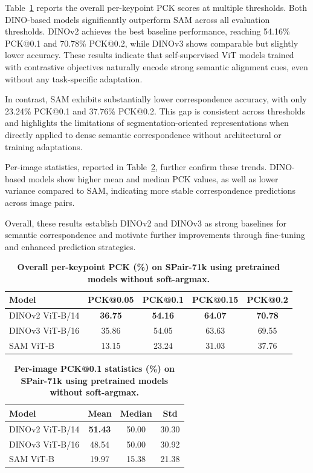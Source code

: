 Table~\ref{tab:baseline_keypoint} reports the overall per-keypoint PCK scores at multiple thresholds.
Both DINO-based models significantly outperform SAM across all evaluation thresholds. DINOv2 achieves the best baseline performance, reaching 54.16\% PCK@0.1
and 70.78\% PCK@0.2, while DINOv3 shows comparable but slightly lower accuracy. These results indicate that self-supervised ViT models trained with
contrastive objectives naturally encode strong semantic alignment cues, even without any task-specific adaptation.

In contrast, SAM exhibits substantially lower correspondence accuracy, with only 23.24\% PCK@0.1 and 37.76\% PCK@0.2. This gap is consistent across
thresholds and highlights the limitations of segmentation-oriented representations when directly applied to dense semantic correspondence without
architectural or training adaptations.

Per-image statistics, reported in Table~\ref{tab:baseline_image}, further confirm these trends.
DINO-based models show higher mean and median PCK values, as well as lower variance compared to SAM, indicating more stable correspondence
predictions across image pairs.

Overall, these results establish DINOv2 and DINOv3 as strong baselines for semantic correspondence and motivate further improvements through fine-tuning and enhanced prediction strategies.


\begin{table}[t]
    \centering
    \caption{\textbf{Overall per-keypoint PCK (\%) on SPair-71k using pretrained models without soft-argmax.}}
    \label{tab:baseline_keypoint}
    \setlength{\tabcolsep}{2pt}
    \begin{tabular}{lcccc}
    \toprule
    Model & PCK@0.05 & PCK@0.1 & PCK@0.15 & PCK@0.2 \\
    \midrule
    DINOv2 ViT-B/14 & \textbf{36.75} & \textbf{54.16} & \textbf{64.07} & \textbf{70.78} \\
    DINOv3 ViT-B/16 & 35.86 & 54.05 & 63.63 & 69.55 \\
    SAM ViT-B       & 13.15 & 23.24 & 31.03 & 37.76 \\
    \bottomrule
    \end{tabular}
\end{table}


\begin{table}[t]
    \centering
    \caption{\textbf{Per-image PCK@0.1 statistics (\%) on SPair-71k using pretrained models without soft-argmax.}}
    \label{tab:baseline_image}
    \begin{tabular}{lccc}
    \toprule
    Model  & Mean & Median & Std \\
    \midrule
    DINOv2 ViT-B/14 & \textbf{51.43} & 50.00 & 30.30 \\
    DINOv3 ViT-B/16 & 48.54 & 50.00 & 30.92 \\
    SAM ViT-B       & 19.97 & 15.38 & 21.38 \\
    \bottomrule
    \end{tabular}
\end{table}



